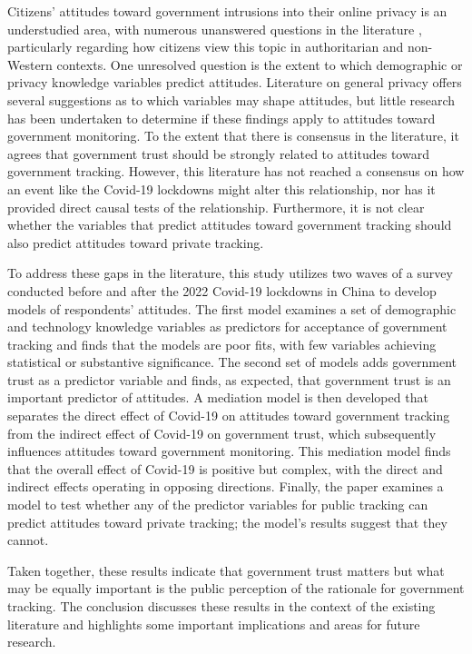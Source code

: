 \documentclass[
  number]{elsarticle}
\begin{document}
Citizens' attitudes toward government intrusions into their online
privacy is an understudied area, with numerous unanswered questions in
the literature \citep{gómez-barroso2018}, particularly regarding how
citizens view this topic in authoritarian and non-Western contexts. One
unresolved question is the extent to which demographic or privacy
knowledge variables predict attitudes. Literature on general privacy
offers several suggestions as to which variables may shape attitudes,
but little research has been undertaken to determine if these findings
apply to attitudes toward government monitoring. To the extent that
there is consensus in the literature, it agrees that government trust
should be strongly related to attitudes toward government tracking.
However, this literature has not reached a consensus on how an event
like the Covid-19 lockdowns might alter this relationship, nor has it
provided direct causal tests of the relationship. Furthermore, it is not
clear whether the variables that predict attitudes toward government
tracking should also predict attitudes toward private tracking.

To address these gaps in the literature, this study utilizes two waves
of a survey conducted before and after the 2022 Covid-19 lockdowns in
China to develop models of respondents' attitudes. The first model
examines a set of demographic and technology knowledge variables as
predictors for acceptance of government tracking and finds that the
models are poor fits, with few variables achieving statistical or
substantive significance. The second set of models adds government trust
as a predictor variable and finds, as expected, that government trust is
an important predictor of attitudes. A mediation model is then developed
that separates the direct effect of Covid-19 on attitudes toward
government tracking from the indirect effect of Covid-19 on government
trust, which subsequently influences attitudes toward government
monitoring. This mediation model finds that the overall effect of
Covid-19 is positive but complex, with the direct and indirect effects
operating in opposing directions. Finally, the paper examines a model to
test whether any of the predictor variables for public tracking can
predict attitudes toward private tracking; the model's results suggest
that they cannot.

Taken together, these results indicate that government trust matters but
what may be equally important is the public perception of the rationale
for government tracking. The conclusion discusses these results in the
context of the existing literature and highlights some important
implications and areas for future research.
\end{document}
